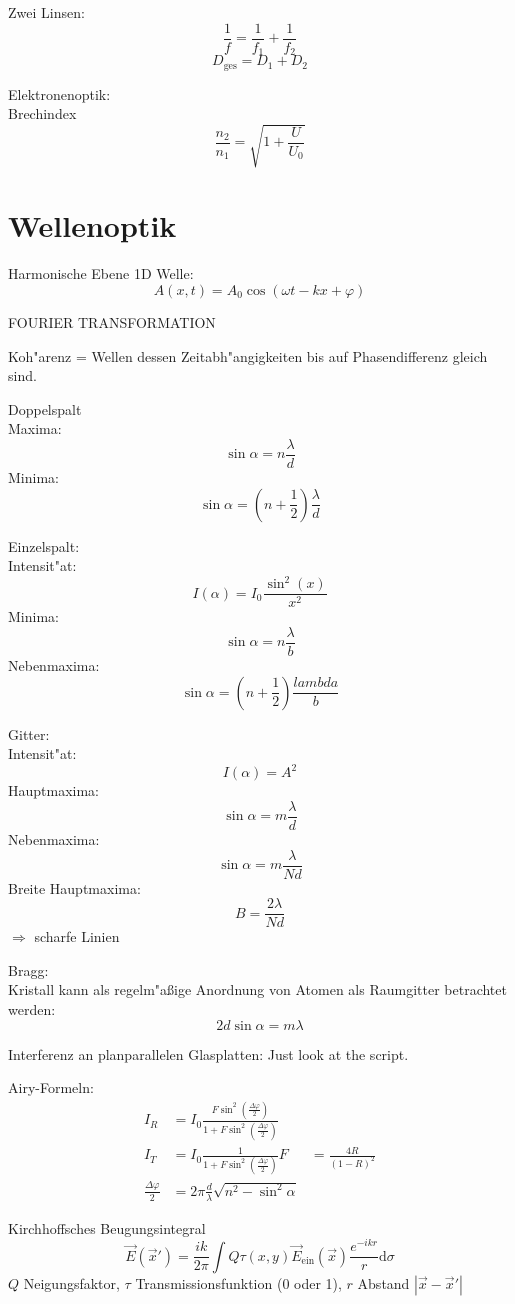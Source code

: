 \documentclass[12pt]{report}
\newcommand{\vphi}{\varphi}
\newcommand{\dd}{\mathrm{d}}
\begin{document}
Zwei Linsen:
\[\frac{1}{f}=\frac{1}{f_1}+\frac{1}{f_2}\]
\[D_\mathrm{ges}=D_1+D_2\]

Elektronenoptik:\\
Brechindex
\[\frac{n_2}{n_1}=\sqrt{1+\frac{U}{U_0}}\]

\section{Wellenoptik}

Harmonische Ebene 1D Welle:
\[A(x,t)=A_0\cos(\omega t-kx+\vphi)\]

FOURIER TRANSFORMATION

Koh"arenz = Wellen dessen Zeitabh"angigkeiten bis auf Phasendifferenz gleich sind.

Doppelspalt\\
Maxima: \[\sin\alpha=n\frac{\lambda}{d}\]
Minima: \[\sin\alpha=\left(n+\frac{1}{2}\right)\frac{\lambda}{d}\]

Einzelspalt:\\
Intensit"at: \[I(\alpha)=I_0\frac{\sin^2(x)}{x^2}\]
Minima: \[\sin\alpha=n\frac{\lambda}{b}\]
Nebenmaxima: \[\sin\alpha=\left(n+\frac{1}{2}\right)\frac{lambda}{b}\]

Gitter:\\
Intensit"at: \[I(\alpha)=A^2\]
Hauptmaxima: \[\sin\alpha=m\frac{\lambda}{d}\]
Nebenmaxima: \[\sin\alpha=m\frac{\lambda}{Nd}\]
Breite Hauptmaxima: \[B=\frac{2\lambda}{Nd}\]
$\Rightarrow$ scharfe Linien

Bragg:\\
Kristall kann als regelm"a\ss ige Anordnung von Atomen als Raumgitter betrachtet werden:
\[2d\sin\alpha=m\lambda\]

Interferenz an planparallelen Glasplatten:
Just look at the script.

Airy-Formeln:
\begin{align*}
I_R&=I_0\frac{F\sin^2\left(\frac{\Delta\vphi}{2}\right)}{1+F\sin^2\left(\frac{\Delta\vphi}{2}\right)}\\
I_T&=I_0\frac{1}{1+F\sin^2\left(\frac{\Delta\vphi}{2}\right)}
F&=\frac{4R}{(1-R)^2}\\
\frac{\Delta\vphi}{2}&=2\pi\frac{d}{\lambda}\sqrt{n^2-\sin^2\alpha}
\end{align*}

Kirchhoffsches Beugungsintegral
\[\vec{E}(\vec{x}')=\frac{ik}{2\pi}\int Q\tau(x,y)\vec{E}_\mathrm{ein}(\vec{x})\frac{e^{-ikr}}{r}\dd\sigma\]
$Q$ Neigungsfaktor, $\tau$ Transmissionsfunktion (0 oder 1), $r$ Abstand $|\vec{x}-\vec{x}'|$
\end{document}
